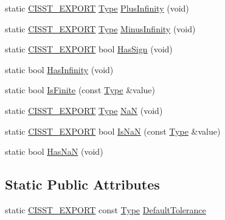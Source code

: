 \begin{DoxyCompactItemize}
\item 
static \hyperlink{cmn_export_macros_8h_a99393e0c3ac434b2605235bbe20684f8}{C\+I\+S\+S\+T\+\_\+\+E\+X\+P\+O\+R\+T} \hyperlink{classcmn_type_traits_aefe66f235207b010b396b5558529a1da}{Type} \hyperlink{classcmn_type_traits_a6424d4282eeee798eecb26a44ab3fec3}{Plus\+Infinity} (void)
\item 
static \hyperlink{cmn_export_macros_8h_a99393e0c3ac434b2605235bbe20684f8}{C\+I\+S\+S\+T\+\_\+\+E\+X\+P\+O\+R\+T} \hyperlink{classcmn_type_traits_aefe66f235207b010b396b5558529a1da}{Type} \hyperlink{classcmn_type_traits_a48fd454b2c1296aa4aa1a69f4833e6fa}{Minus\+Infinity} (void)
\item 
static \hyperlink{cmn_export_macros_8h_a99393e0c3ac434b2605235bbe20684f8}{C\+I\+S\+S\+T\+\_\+\+E\+X\+P\+O\+R\+T} bool \hyperlink{classcmn_type_traits_abb120b3353d432e2d3e00dd8bb478df9}{Has\+Sign} (void)
\item 
static bool \hyperlink{classcmn_type_traits_ace3a699f3986a4daff0116aeb5f2ca8a}{Has\+Infinity} (void)
\item 
static bool \hyperlink{classcmn_type_traits_aa14a8fd2ac2d4d43954001a77261cea9}{Is\+Finite} (const \hyperlink{classcmn_type_traits_aefe66f235207b010b396b5558529a1da}{Type} \&value)
\item 
static \hyperlink{cmn_export_macros_8h_a99393e0c3ac434b2605235bbe20684f8}{C\+I\+S\+S\+T\+\_\+\+E\+X\+P\+O\+R\+T} \hyperlink{classcmn_type_traits_aefe66f235207b010b396b5558529a1da}{Type} \hyperlink{classcmn_type_traits_acfa16ce53e0a6962a9dba4133ce0536f}{Na\+N} (void)
\item 
static \hyperlink{cmn_export_macros_8h_a99393e0c3ac434b2605235bbe20684f8}{C\+I\+S\+S\+T\+\_\+\+E\+X\+P\+O\+R\+T} bool \hyperlink{classcmn_type_traits_a28a75039ed08e387128420f5b18761dd}{Is\+Na\+N} (const \hyperlink{classcmn_type_traits_aefe66f235207b010b396b5558529a1da}{Type} \&value)
\item 
static bool \hyperlink{classcmn_type_traits_a10e7c8086bb949f7911d5f1c26f8ee6f}{Has\+Na\+N} (void)
\end{DoxyCompactItemize}
\subsection*{Static Public Attributes}
\begin{DoxyCompactItemize}
\item 
static \hyperlink{cmn_export_macros_8h_a99393e0c3ac434b2605235bbe20684f8}{C\+I\+S\+S\+T\+\_\+\+E\+X\+P\+O\+R\+T} const \hyperlink{classcmn_type_traits_aefe66f235207b010b396b5558529a1da}{Type} \hyperlink{classcmn_type_traits_ad26b1da1fc0ccccc3b84735dd2a26e35}{Default\+Tolerance}
\end{DoxyCompactItemize}


